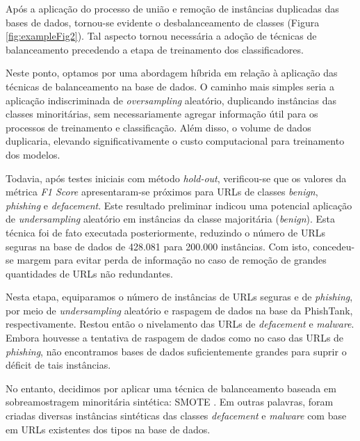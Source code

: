 \documentclass[manuscript,screen,review]{acmart}
\begin{document}

Após a aplicação do processo de união e remoção de instâncias duplicadas das bases de dados, tornou-se evidente o desbalanceamento de classes (Figura \ref{fig:exampleFig2}). Tal aspecto tornou necessária a adoção de técnicas de balanceamento precedendo a etapa de treinamento dos classificadores.

Neste ponto, optamos por uma abordagem híbrida em relação à aplicação das técnicas de balanceamento na base de dados. O caminho mais simples seria a aplicação indiscriminada de \emph{oversampling} aleatório, duplicando instâncias das classes minoritárias, sem necessariamente agregar informação útil para os processos de treinamento e classificação. Além disso, o volume de dados duplicaria, elevando significativamente o custo computacional para treinamento dos modelos.

Todavia, após testes iniciais com método \emph{hold-out}, verificou-se que os valores da métrica \emph{F1 Score} apresentaram-se próximos para URLs de classes \emph{benign}, \emph{phishing} e \emph{defacement}. Este resultado preliminar indicou uma potencial aplicação de \emph{undersampling} aleatório em instâncias da classe majoritária (\emph{benign}). Esta técnica foi de fato executada posteriormente, reduzindo o número de URLs seguras na base de dados de 428.081 para 200.000 instâncias. Com isto, concedeu-se margem para evitar perda de informação no caso de remoção de grandes quantidades de URLs não redundantes.

Nesta etapa, equiparamos o número de instâncias de URLs seguras e de \emph{phishing}, por meio de \emph{undersampling} aleatório e raspagem de dados na base da PhishTank, respectivamente. Restou então o nivelamento das URLs de \emph{defacement} e \emph{malware}. Embora houvesse a tentativa de raspagem de dados como no caso das URLs de \emph{phishing}, não encontramos bases de dados suficientemente grandes para suprir o déficit de tais instâncias.

No entanto, decidimos por aplicar uma técnica de balanceamento baseada em sobreamostragem minoritária sintética: SMOTE \cite{DBLP:journals/corr/abs-1106-1813}. Em outras palavras, foram criadas diversas instâncias sintéticas das classes \emph{defacement} e \emph{malware} com base em URLs existentes dos tipos na base de dados.
\end{document}
